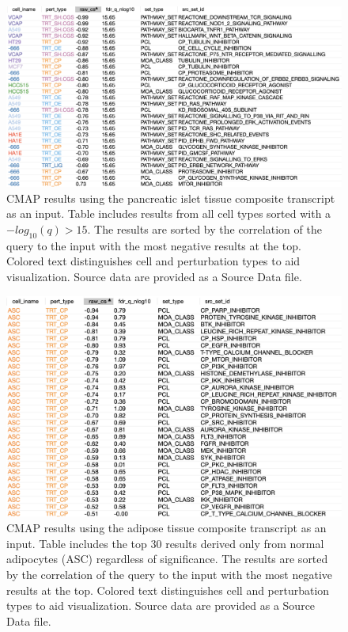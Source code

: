 \documentclass[
]{article}
\begin{document}
\begin{figure}[ht!]
\includegraphics[width=\textwidth]{Figures/Supp_Fig_Islet_all_cell_types.png} 
\caption{CMAP results using the pancreatic islet tissue composite transcript 
as an input. Table includes results from all cell types sorted with a 
$-log_{10}(q) > 15$. The results are sorted by the correlation of the 
query to the input with the most negative results at the top. Colored 
text distinguishes cell and perturbation types to aid visualization. 
Source data are provided as a Source Data file.
}
\label{fig:clue_islet_all}
\end{figure}

\begin{figure}[ht!]
\includegraphics[width=\textwidth]{Figures/Supp_Fig_Adipose_ASC.png} 
\caption{CMAP results using the adipose tissue composite 
transcript as an input. Table includes the top 30 results derived
only from normal adipocytes (ASC) regardless of significance. 
The results are sorted by the correlation of the query to the input 
with the most negative results at the top. Colored text distinguishes 
cell and perturbation types to aid visualization. Source data are provided 
as a Source Data file.
}
\label{fig:clue_adipose_asc}
\end{figure}
\end{document}
